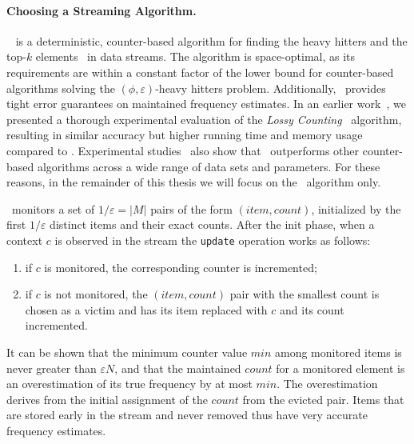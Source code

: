 \paragraph*{Choosing a Streaming Algorithm.} {\em \spacesaving}~\cite{Metwally06} is a deterministic, counter-based algorithm for finding the heavy hitters and the top-$k$ elements~\cite{Charikar02} in data streams. The algorithm is space-optimal, as its requirements are within a constant factor of the lower bound for counter-based algorithms solving the $(\phi,\varepsilon)$-heavy hitters problem. Additionally, \spacesaving\ provides tight error guarantees on maintained frequency estimates. In an earlier work~\cite{Delia2011}, we presented a thorough
experimental evaluation of the {\em Lossy Counting}~\cite{Manku02} algorithm, resulting in similar accuracy but higher running time and memory usage compared to \spacesaving. Experimental studies~\cite{Cormode08,Manerikar2009} also show that \spacesaving\ outperforms other counter-based algorithms across a wide range of data sets and parameters. For these reasons, in the remainder of this thesis we will focus on the \spacesaving\ algorithm only.


\spacesaving\ monitors a set of $1/\varepsilon=|M|$ pairs of the form $(item, count)$, initialized by the first $1/\varepsilon$ distinct items and their exact counts. After the init phase, when a context $c$ is observed in the stream the {\tt update} operation works as follows: 

\begin{enumerate}[parsep=0pt]
\item if $c$ is monitored, the corresponding counter is incremented; 
\item if $c$ is not monitored, the $(item, count)$ pair with the smallest count is chosen as a victim and has its item replaced with $c$ and its count incremented.
\end{enumerate}

\noindent It can be shown that the minimum counter value $min$ among monitored items is never greater than $\varepsilon N$, and that the maintained $count$ for a monitored element is an overestimation of its true frequency by at most $min$. The overestimation derives from the initial assignment of the $count$ from the evicted pair. Items that are stored early in the stream and never removed thus have very accurate frequency estimates.

